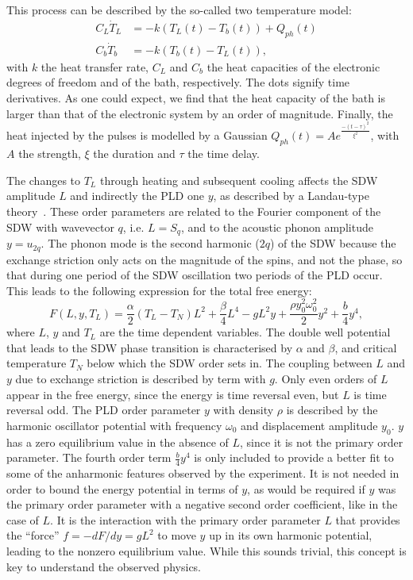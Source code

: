This process can be described by the so-called two temperature model:
\begin{align}
	\label{eq:Cr_twotemp}
	C_L \dot{T}_L &= -k(T_L(t) - T_b(t)) + Q_{ph}(t) \\
	C_b \dot{T}_b &= -k(T_b(t) - T_L(t)),\nonumber
\end{align}
with $k$ the heat transfer rate, $C_L$ and $C_b$ the heat capacities of the electronic degrees of freedom and of the bath, respectively.
The dots signify time derivatives.
As one could expect, we find that the heat capacity of the bath is larger than that of the electronic system by an order of magnitude.
Finally, the heat injected by the pulses is modelled by a Gaussian $Q_{ph}(t) = A e^{\frac{-(t - \tau)^2}{\xi^2}}$, with $A$ the strength, $\xi$ the duration and $\tau$ the time delay.

The changes to $T_L$ through heating and subsequent cooling affects the SDW amplitude $L$ and indirectly the PLD one $y$, as described by a Landau-type theory~\cite{Khomskii2010}.
These order parameters are related to the Fourier component of the SDW with wavevector $q$, i.e. $L = S_q$, and to the acoustic phonon amplitude $y = u_{2q}$.
The phonon mode is the second harmonic ($2q$) of the SDW because the exchange striction only acts on the magnitude of the spins, and not the phase, so that during one period of the SDW oscillation two periods of the PLD occur.
This leads to the following expression for the total free energy:
\begin{equation}
	\label{eq:Cr_landau}
	F(L, y, T_L) = \frac{\alpha}{2}(T_L - T_N) L^2 + \frac{\beta}{4} L^4 - g L^2 y + \frac{\rho y_0^2 \omega_0^2}{2} y^2 + \frac{b}{4} y^4,
\end{equation}
where $L$, $y$ and $T_L$ are the time dependent variables.
The double well potential that leads to the SDW phase transition is characterised by $\alpha$ and $\beta$,  and critical temperature $T_N$ below which the SDW order sets in.
The coupling between $L$ and $y$ due to exchange striction is described by term with $g$.
Only even orders of $L$ appear in the free energy, since the energy is time reversal even, but $L$ is time reversal odd.
The PLD order parameter $y$ with density $\rho$ is described by the harmonic oscillator potential with frequency $\omega_0$ and displacement amplitude $y_0$.
$y$ has a zero equilibrium value in the absence of $L$, since it is not the primary order parameter.
The fourth order term $\frac{b}{4}y^4$ is only included to provide a better fit to some of the anharmonic features observed by the experiment.
It is not needed in order to bound the energy potential in terms of $y$, as would be required if $y$ was the primary order parameter with a negative second order coefficient, like in the case of $L$.
It is the interaction with the primary order parameter $L$ that provides the ``force'' $f = -dF/dy = gL^2$ to move $y$ up in its own harmonic potential, leading to the nonzero equilibrium value.
While this sounds trivial, this concept is key to understand the observed physics.

